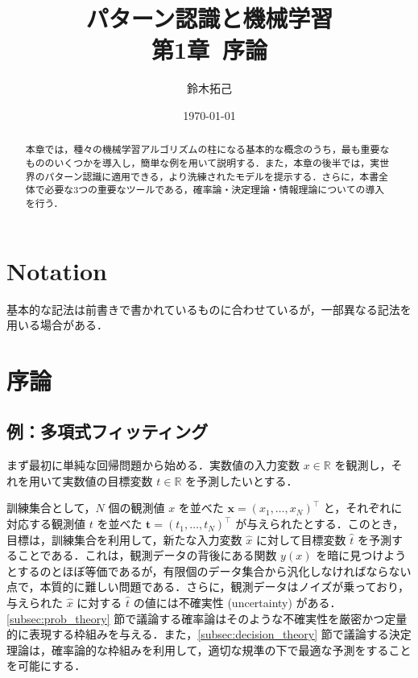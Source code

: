 \documentclass[uplatex,a4paper,oneside,openany,dvipdfmx]{jsarticle}
\title{パターン認識と機械学習\\第1章\ 序論}
\author{鈴木拓己}
\date{\today}
\numberwithin{equation}{section}
\theoremstyle{mystyle} %
\newcommand{\BR}{\mathbb{R}}
\newcommand{\mb}[1]{\mathbf{#1}}
\begin{document}
\maketitle
\thispagestyle{empty}
\setcounter{tocdepth}{3}

\tableofcontents

\begin{abstract}
    本章では，種々の機械学習アルゴリズムの柱になる基本的な概念のうち，最も重要なもののいくつかを導入し，簡単な例を用いて説明する．また，本章の後半では，実世界のパターン認識に適用できる，より洗練されたモデルを提示する．さらに，本書全体で必要な3つの重要なツールである，確率論・決定理論・情報理論についての導入を行う．
\end{abstract}

\section*{Notation}

基本的な記法は前書きで書かれているものに合わせているが，一部異なる記法を用いる場合がある．

\section{序論}

\subsection{例：多項式フィッティング} \label{subsec:poly_fitting}

まず最初に単純な回帰問題から始める．実数値の入力変数 $x \in \BR$ を観測し，それを用いて実数値の目標変数 $t \in \BR$ を予測したいとする．

訓練集合として，$N$ 個の観測値 $x$ を並べた $\mb{x} = (x_{1},\ldots,x_{N})^{\top}$ と，それぞれに対応する観測値 $t$ を並べた $\mb{t} = (t_{1},\ldots,t_{N})^{\top}$ が与えられたとする．このとき，目標は，訓練集合を利用して，新たな入力変数 $\hat{x}$ に対して目標変数 $\hat{t}$ を予測することである．これは，観測データの背後にある関数 $y(x)$ を暗に見つけようとするのとほぼ等価であるが，有限個のデータ集合から汎化しなければならない点で，本質的に難しい問題である．さらに，観測データはノイズが乗っており，与えられた $\hat{x}$ に対する $\hat{t}$ の値には不確実性 (uncertainty) がある．\ref{subsec:prob_theory} 節で議論する確率論はそのような不確実性を厳密かつ定量的に表現する枠組みを与える．また，\ref{subsec:decision_theory} 節で議論する決定理論は，確率論的な枠組みを利用して，適切な規準の下で最適な予測をすることを可能にする．
\end{document}
